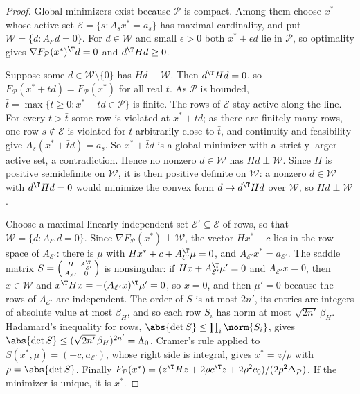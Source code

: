 \begin{proof}
Global minimizers exist because $\mathcal P$ is compact. Among them choose
$x^*$ whose active set $\mathcal E=\{s:A_sx^*=a_s\}$ has maximal
cardinality, and put $\mathcal W=\{d:A_{\mathcal E}d=0\}$. For
$d\in\mathcal W$ and small $\epsilon>0$ both $x^*\pm\epsilon d$ lie in
$\mathcal P$, so optimality gives $\nabla F_{\mathcal P}(x^*)^{\T}d=0$ and
$d^{\T}Hd\ge0$.

Suppose some $d\in\mathcal W\setminus\{0\}$ has $Hd\perp\mathcal W$. Then
$d^{\T}Hd=0$, so $F_{\mathcal P}(x^*+td)=F_{\mathcal P}(x^*)$ for all real
$t$. As $\mathcal P$ is bounded, $\bar t=\max\{t\ge0:x^*+td\in\mathcal P\}$
is finite. The rows of $\mathcal E$ stay active along the line. For every
$t>\bar t$ some row is violated at $x^*+td$; as there are finitely many
rows, one row $s\notin\mathcal E$ is violated for $t$ arbitrarily close to
$\bar t$, and continuity and feasibility give $A_s(x^*+\bar td)=a_s$. So
$x^*+\bar td$ is a global minimizer with a strictly larger active set, a
contradiction. Hence no nonzero $d\in\mathcal W$ has $Hd\perp\mathcal W$.
Since $H$ is positive semidefinite on $\mathcal W$, it is then positive
definite on $\mathcal W$: a nonzero $d\in\mathcal W$ with $d^{\T}Hd=0$ would
minimize the convex form $d\mapsto d^{\T}Hd$ over $\mathcal W$, so
$Hd\perp\mathcal W$.

Choose a maximal linearly independent set $\mathcal E'\subseteq\mathcal E$
of rows, so that $\mathcal W=\{d:A_{\mathcal E'}d=0\}$. Since
$\nabla F_{\mathcal P}(x^*)\perp\mathcal W$, the vector $Hx^*+c$ lies in the
row space of $A_{\mathcal E'}$: there is $\mu$ with
$Hx^*+c+A_{\mathcal E'}^{\T}\mu=0$, and $A_{\mathcal E'}x^*=a_{\mathcal E'}$.
The saddle matrix
$S=\left(\begin{smallmatrix}H&A_{\mathcal E'}^{\T}\\A_{\mathcal E'}&0\end{smallmatrix}\right)$
is nonsingular: if $Hx+A_{\mathcal E'}^{\T}\mu'=0$ and $A_{\mathcal E'}x=0$,
then $x\in\mathcal W$ and $x^{\T}Hx=-(A_{\mathcal E'}x)^{\T}\mu'=0$, so $x=0$,
and then $\mu'=0$ because the rows of $A_{\mathcal E'}$ are independent. The
order of $S$ is at most $2n'$, its entries are integers of absolute value at
most $\beta_H$, and so each row $S_i$ has norm at most $\sqrt{2n'}\,\beta_H$.
Hadamard's inequality for rows, $\abs{\det S}\le\prod_i\norm{S_i}$, gives
$\abs{\det S}\le(\sqrt{2n'}\,\beta_H)^{2n'}=\Lambda_0$. Cramer's rule applied
to $S(x^*,\mu)=(-c,a_{\mathcal E'})$, whose right side is integral, gives
$x^*=z/\rho$ with $\rho=\abs{\det S}$. Finally
$F_{\mathcal P}(x^*)=(z^{\T}Hz+2\rho c^{\T}z+2\rho^2c_0)/(2\rho^2\Delta_{\mathcal P})$.
If the minimizer is unique, it is $x^*$.
\end{proof}

